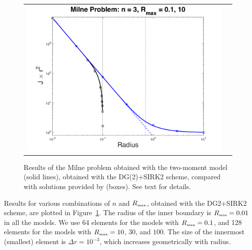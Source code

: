 \documentclass[10pt,preprint]{aastex}
\begin{document}
\begin{figure}
\begin{center}
\begin{tabular}{cc}
      \includegraphics[scale=0.4]{./Figures/MilneProblem1D_n30.png}
    \end{tabular}
  \end{center}
  \caption{Results of the Milne problem obtained with the two-moment model (solid lines), obtained with the DG(2)+SIRK2 scheme, compared with solutions provided by \citep{hummerRybicki_1971} (boxes).  See text for details.}
  \label{fig:milneProblem1D}
\end{figure}

Results for various combinations of $n$ and $R_{\mbox{\tiny max}}$, obtained with the DG2+SIRK2 scheme, are plotted in Figure~\ref{fig:milneProblem1D}.  
The radius of the inner boundary is $R_{\mbox{\tiny min}}=0.01$ in all the models.  
We use 64 elements for the models with $R_{\mbox{\tiny max}}=0.1$, and 128 elements for the models with $R_{\mbox{\tiny max}}=10$, $30$, and $100$.  
The size of the innermost (smallest) element is $\Delta r=10^{-3}$, which increases geometrically with radius.  
\end{document}
